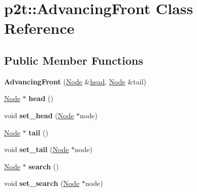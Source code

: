 \hypertarget{classp2t_1_1AdvancingFront}{}\section{p2t\+:\+:Advancing\+Front Class Reference}
\label{classp2t_1_1AdvancingFront}
\subsection*{Public Member Functions}
\begin{DoxyCompactItemize}
\item 
\mbox{\label{classp2t_1_1AdvancingFront_aaea788406dc0ede87ab08901b64e6a62}} 
{\bfseries Advancing\+Front} (\hyperlink{structp2t_1_1Node}{Node} \&\hyperlink{structhead}{head}, \hyperlink{structp2t_1_1Node}{Node} \&tail)
\item 
\mbox{\label{classp2t_1_1AdvancingFront_a1aaf09a3d1fd17743549de1a77965883}} 
\hyperlink{structp2t_1_1Node}{Node} $\ast$ {\bfseries head} ()
\item 
\mbox{\label{classp2t_1_1AdvancingFront_a07f4df2b993ec6fba32491d87d76aefe}} 
void {\bfseries set\+\_\+head} (\hyperlink{structp2t_1_1Node}{Node} $\ast$node)
\item 
\mbox{\label{classp2t_1_1AdvancingFront_a61de74fbeeb93ff0481de377d5072370}} 
\hyperlink{structp2t_1_1Node}{Node} $\ast$ {\bfseries tail} ()
\item 
\mbox{\label{classp2t_1_1AdvancingFront_a3e42d890f8871eecdbd9789d141800b8}} 
void {\bfseries set\+\_\+tail} (\hyperlink{structp2t_1_1Node}{Node} $\ast$node)
\item 
\mbox{\label{classp2t_1_1AdvancingFront_a77046a96ab291e136dfd3072b74b88b5}} 
\hyperlink{structp2t_1_1Node}{Node} $\ast$ {\bfseries search} ()
\item 
\mbox{\label{classp2t_1_1AdvancingFront_a27bbf888fd7c036db00347278591c2c4}} 
void {\bfseries set\+\_\+search} (\hyperlink{structp2t_1_1Node}{Node} $\ast$node)
\item 

\end{DoxyCompactItemize}
